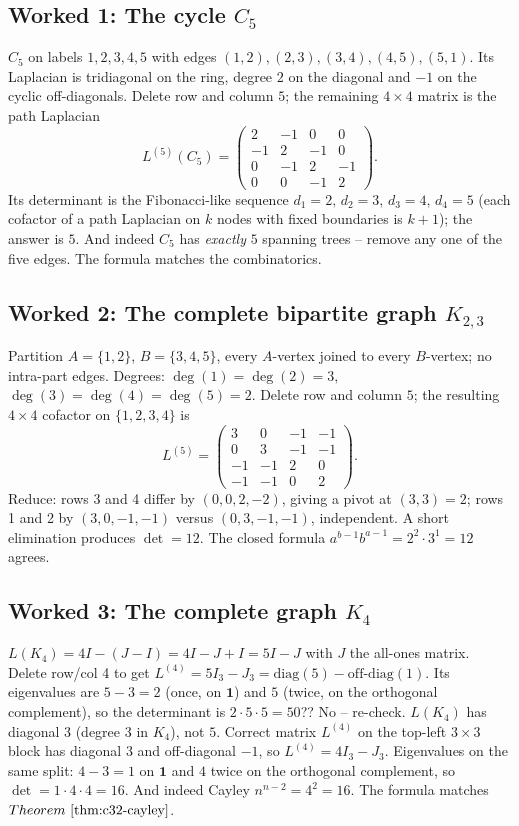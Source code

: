 \subsection*{Worked 1: The cycle \(C_5\)}

\(C_5\) on labels \(1,2,3,4,5\) with edges \((1,2),(2,3),(3,4),(4,5),(5,1)\).
Its Laplacian is tridiagonal on the ring, degree \(2\) on the diagonal and
\(-1\) on the cyclic off-diagonals.  Delete row and column \(5\); the
remaining \(4\times 4\) matrix is the path Laplacian
\[
  L^{(5)}(C_5) = \begin{pmatrix} 2 &-1 & 0 & 0\\ -1 & 2 &-1 & 0\\ 0&-1&2&-1\\ 0&0&-1&2\end{pmatrix}.
\]
Its determinant is the Fibonacci-like sequence \(d_1=2,\, d_2=3,\, d_3=4,\,
d_4=5\) (each cofactor of a path Laplacian on \(k\) nodes with fixed
boundaries is \(k+1\)); the answer is \(5\).  And indeed \(C_5\) has
\emph{exactly} \(5\) spanning trees -- remove any one of the five edges.
The formula matches the combinatorics.

\subsection*{Worked 2: The complete bipartite graph \(K_{2,3}\)}

Partition \(A=\{1,2\}\), \(B=\{3,4,5\}\), every \(A\)-vertex joined to every
\(B\)-vertex; no intra-part edges.  Degrees: \(\deg(1)=\deg(2)=3,\)
\(\deg(3)=\deg(4)=\deg(5)=2\).  Delete row and column \(5\); the resulting
\(4\times 4\) cofactor on \(\{1,2,3,4\}\) is
\[
  L^{(5)} = \begin{pmatrix}3&0&-1&-1\\0&3&-1&-1\\-1&-1&2&0\\-1&-1&0&2\end{pmatrix}.
\]
Reduce: rows 3 and 4 differ by \((0,0,2,-2)\), giving a pivot at \((3,3)=2\);
rows 1 and 2 by \((3,0,-1,-1)\) versus \((0,3,-1,-1)\), independent.  A
short elimination produces \(\det = 12\).  The closed formula
\(a^{b-1}b^{a-1}=2^{2}\cdot 3^{1}=12\) agrees.

\subsection*{Worked 3: The complete graph \(K_4\)}

\(L(K_4)=4I - (J-I) = 4I - J + I = 5I - J\) with \(J\) the all-ones matrix.
Delete row/col 4 to get \(L^{(4)}=5I_3 - J_3 = \mathrm{diag}(5)-\mathrm{off\text{-}diag}(1)\).
Its eigenvalues are \(5-3=2\) (once, on \(\mathbf{1}\)) and \(5\) (twice, on
the orthogonal complement), so the determinant is \(2\cdot 5\cdot 5=50\)??  No
-- re-check.  \(L(K_4)\) has diagonal \(3\) (degree \(3\) in \(K_4\)), not
\(5\).  Correct matrix \(L^{(4)}\) on the top-left \(3\times 3\) block has
diagonal \(3\) and off-diagonal \(-1\), so \(L^{(4)}=4I_3 - J_3\).
Eigenvalues on the same split: \(4-3=1\) on \(\mathbf{1}\) and \(4\) twice on
the orthogonal complement, so \(\det = 1\cdot 4 \cdot 4 = 16\).  And indeed
Cayley \(n^{n-2}=4^2=16\).  The formula matches \(\thmref{c32-cayley}\).

